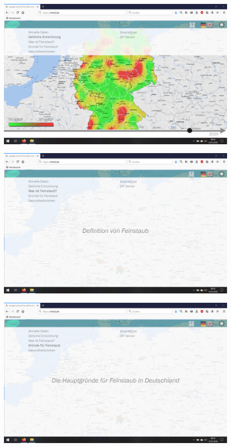 \begin{center}
	\includegraphics[width=0.9\textwidth]{media/Zeitliche-Entwicklung} 

\vspace{1cm}
	
	\includegraphics[width=0.9\textwidth]{media/Definition-von-Feinstaub} 
	
	
	\includegraphics[width=0.9\textwidth]{media/Gruende-Feinstaub} 
	

\end{center}

